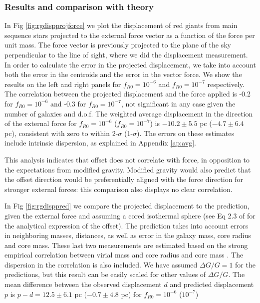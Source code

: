 \documentclass[useAMS,usenatbib,twocolumn]{mn2e}
\newcommand{\jakesays}[1]{{\color{red}[Jake says: #1]}}
\begin{document}
\subsubsection{Results and comparison with theory}
In Fig \ref{fig:rgdispprojforce} we plot the displacement of red
giants from  main sequence stars projected to the external force vector as a 
function of the force per unit mass. The force vector is previously
projected to the plane of the sky 
perpendicular to the line of sight, where we did the displacement measurement.
In order to calculate the error in the projected displacement, 
we take into account both the error in the centroids and the error in the
vector force. We show the results on the left and right panels  
for $f_{R0}=10^{-6}$ and $f_{R0}=10^{-7}$ respectively. The correlation between
the projected displacement and the force applied is -0.2  
for $f_{R0}=10^{-6}$ and -0.3 for $f_{R0}=10^{-7}$, not significant in any  case
given the number of galaxies and d.o.f. 
The weighted average displacement in the direction of the 
external force for $f_{R0} = 10^{-6}$ ($f_{R0} = 10^{-7}$) is
$-10.2\pm5.5$ pc ($-4.7\pm6.4$ pc),
consistent with zero to within 2-$\sigma$ (1-$\sigma$).
The errors on these estimates include intrinsic dispersion, as explained
in Appendix \ref{ap:avg}.

This analysis indicates that offset does not correlate with force, in opposition
to the expectations from modified gravity.  Modified gravity would also predict
that the offset direction would be preferentially aligned with the force direction
for stronger external forces: this comparison also displays no clear correlation.


In Fig \ref{fig:rgdisppred} we compare the projected displacement to the
prediction, given the external force and assuming a cored isothermal sphere
(see Eq 2.3 of \cite{bhuvjake2011} for the analytical expression of the offset).
The prediction takes into account errors in neighboring masses, distances, as well as
error in the galaxy mass, core radius and core mass. These last two
measurements are estimated based on the strong empirical correlation
between virial mass and core radius and core mass \citep{swaters03,swaters11}.
The dispersion in the correlation is also included. We have assumed $\Delta G/G =1$
for the predictions, but this result can be easily scaled for other values of 
$\Delta G/G$.
The mean difference between the observed displacement $d$ and predicted
displacement $p$ is $p-d=12.5\pm6.1$ pc ($-0.7\pm4.8$ pc) for
$f_{R0} = 10^{-6}$ ($10^{-7}$)
\end{document}
